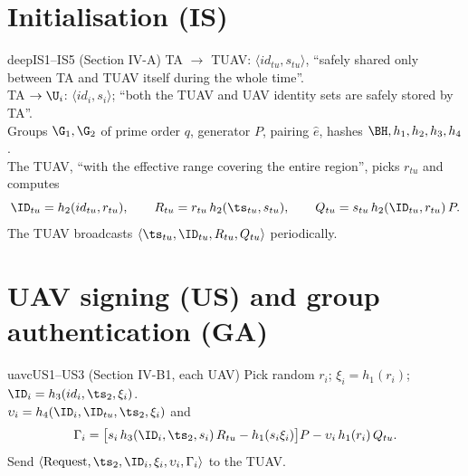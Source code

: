 \section{Initialisation (IS)}
\begin{stepbox}{deep}{IS1--IS5 \;(Section IV-A)}
 TA $\to$ TUAV: $\langle id_{tu},s_{tu}\rangle$, ``safely shared only between TA and TUAV itself during the whole time''.\\
 TA $\to\U_i$: $\langle id_i,s_i\rangle$; ``both the TUAV and UAV identity sets are safely stored by TA''.\\
 Groups $\G_1,\G_2$ of prime order $q$, generator $P$, pairing $\hat e$, hashes $\BH,h_1,h_2,h_3,h_4$.\\
 The TUAV, ``with the effective range covering the entire region'', picks $r_{tu}$ and computes
\[ \ID_{tu}=h_2(id_{tu},r_{tu}),\qquad R_{tu}=r_{tu}\,h_2(\ts_{tu},s_{tu}),\qquad Q_{tu}=s_{tu}\,h_2(\ID_{tu},r_{tu})\,P. \]
 The TUAV broadcasts $\langle\ts_{tu},\ID_{tu},R_{tu},Q_{tu}\rangle$ periodically.
\end{stepbox}

\section{UAV signing (US) and group authentication (GA)}
\begin{stepbox}{uavc}{US1--US3 \;(Section IV-B1, each UAV)}
 Pick random $r_i$; \;$\xi_i=h_1(r_i)$; \;$\ID_i=h_3(id_i,\ts_2,\xi_i)$.\\
 $\upsilon_i=h_4(\ID_i,\ID_{tu},\ts_2,\xi_i)$ and
\begin{equation}\label{eq:gamma}
\Gamma_i=\big[s_i\,h_3(\ID_i,\ts_2,s_i)\,R_{tu}-h_1(s_i\xi_i)\big]P-\upsilon_i\,h_1(r_i)\,Q_{tu}.
\end{equation}
 Send $\langle\text{Request},\ts_2,\ID_i,\xi_i,\upsilon_i,\Gamma_i\rangle$ to the TUAV.
\end{stepbox}

